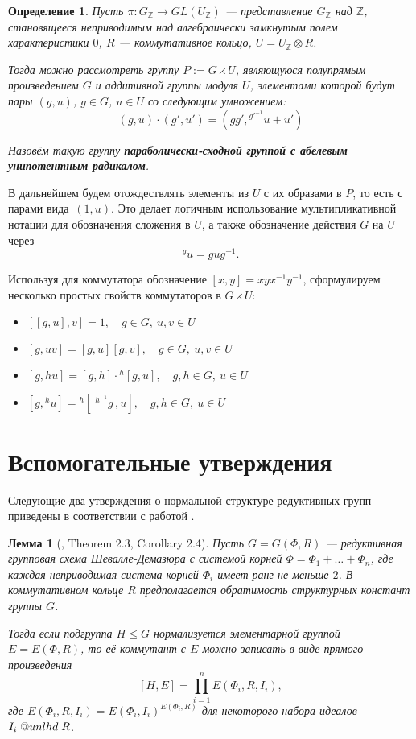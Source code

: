 \documentclass[12pt]{matmex-diploma}
\makeatletter
\newcommand{\slunlhd}{%
  \mathrel{\mathpalette\sl@unlhd\relax}%
}
\newcommand{\sl@unlhd}[2]{%
  \sbox\z@{$#1\lhd$}%
  \sbox\tw@{$#1\leqslant$}%
  \dimen@=\ht\tw@
  \advance\dimen@-\ht\z@
  \ifx#1\displaystyle
    \advance\dimen@ .2pt
  \else
    \ifx#1\textstyle
      \advance\dimen@ .2pt
    \fi
  \fi
  \ooalign{\raisebox{\dimen@}{$\m@th#1\lhd$}\cr$\m@th#1\leqslant$\cr}%
}
\theoremstyle{mystyleni}
\theoremstyle{mystyle}
\newtheorem{lm}{Лемма}
\newtheorem{definition}{Определение}
\newcommand{\Z}{\mathbb{Z}}
\renewcommand{\le}{\leqslant}
\renewcommand{\trianglelefteq}{\slunlhd}
\makeatother
\begin{document}
\begin{framed}
\begin{definition}
Пусть $\pi:G_\Z \to GL(U_\Z)$ --- представление $G_\Z$ над $\Z$, становящееся неприводимым над алгебраически замкнутым полем характеристики $0$, $R$ --- коммутативное кольцо, $U=U_\Z\otimes R$.

Тогда можно рассмотреть группу $P:=G\rightthreetimes U$, являющуюся полупрямым произведением $G$ и аддитивной группы модуля $U$, элементами которой будут пары $(g,u)$, $g \in G$, $u \in U$ со следующим умножением:
$$
(g,u)\cdot (g',u') = (g g', {}^{g'^{-1}} u + u')
$$

Назовём такую группу \textit{\textbf{параболически-сходной группой с абелевым унипотентным радикалом}}.
\end{definition}
\end{framed}

В дальнейшем будем отождествлять элементы из $U$ с их образами в $P$, то есть с парами вида~$(1,u)$.
Это делает логичным использование мультипликативной нотации для обозначения сложения в $U$, а также обозначение действия $G$ на $U$ через $$^{g}u = g u g^{-1}.$$ 

Используя для коммутатора обозначение $[x,y]=x y x^{-1}y^{-1}$,
сформулируем несколько простых свойств коммутаторов в $G \rightthreetimes U$:

\begin{itemize}[label={\LARGE\raisebox{-0.5ex}{\textbullet}\quad},leftmargin=4\parindent]
\item
$[[g,u],v] = 1, \quad g \in G, \ u,v \in U $
\linespread{3}
\item 
$[g,uv] = [g,u][g,v], \quad g \in G, \ u,v \in U $
\item
$[g,hu] = [g,h]\cdot{}^h[g,u], \quad g,h \in G, \ u \in U $
\item
$[g,{}^{h}u] = {}^h[\;{}^{h^{-1}}g\,,u], \quad g,h \in G, \ u \in U $
\end{itemize}

\pagebreak
\section{Вспомогательные утверждения}

Следующие два утверждения о нормальной структуре редуктивных групп приведены в соответствии с работой \citep{Stavrova2009}.

\begin{lm}[\citep{Stavrova2009}, Theorem 2.3, Corollary 2.4]
  \label{directproduct}
  Пусть $G = G(\Phi, R)$ --- редуктивная групповая схема Шевалле-Демазюра
  с системой корней $\Phi = \Phi_1 + \ldots + \Phi_n$, где каждая неприводимая система корней $\Phi_i$ имеет ранг не меньше $2$. В коммутативном кольце $R$ предполагается обратимость структурных констант группы $G$.
  
  Тогда если подгруппа $H \le G$ нормализуется элементарной группой $E = E(\Phi,R)$, то её коммутант с $E$ можно записать в виде прямого произведения
  $$ [H, E] = \prod_{i=1}^n E(\Phi_i,R,I_i), $$
  где $E(\Phi_i,R,I_i) = E(\Phi_i,I_i)^{E(\Phi_i,R)}$ для некоторого набора идеалов $I_i \trianglelefteq R$.
\end{lm}
\end{document}
